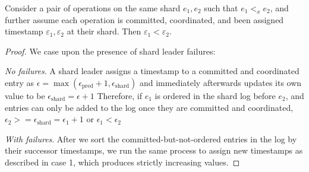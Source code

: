 \begin{lem}
\label{lemma2}
Consider a pair of operations on the same shard $e_1, e_2$ such that $e_1 <_x e_2$, and further assume each operation is committed, coordinated, and been assigned timestamp $\varepsilon_1, \varepsilon_2$ at their shard. Then $\varepsilon_1 < \varepsilon_2$.
\end{lem}
\begin{proof}
We case upon the presence of shard leader failures:

 \textit{No failures}.
A shard leader assigns a timestamp to a committed and coordinated entry as 
$\epsilon = \max(\epsilon_{\text{pred}} + 1, \epsilon_{\text{shard}})$ and immediately afterwards updates its own value to be 
$\epsilon_{\text{shard}} = \epsilon + 1$
Therefore, if $e_1$ is ordered in the shard log before $e_2$, and entries can only be added to the log once they are committed and coordinated, 
$\epsilon_2 >= \epsilon_{\text{shard}} = \epsilon_1 + 1$ or
$\epsilon_1 < \epsilon_2$

 \textit{With failures}.
After we sort the committed-but-not-ordered entries in the log by their successor timestamps, we run the same process to assign new timestamps as described in case 1, which produces strictly increasing values.



\end{proof}

